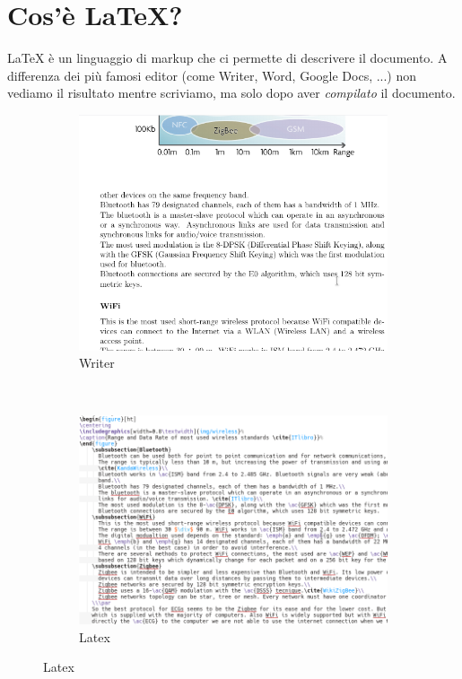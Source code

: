 \section{Cos'\`{e} \LaTeX?}
  \LaTeX{} è un linguaggio di markup che ci permette di descrivere il documento. A differenza dei più famosi editor (come Writer, Word, Google Docs, ...) non vediamo il risultato mentre scriviamo, ma solo dopo aver \emph{compilato} il documento.
  \begin{figure}[!h]
    \centering
    \begin{subfigure}[b]{0.4\textwidth}
        \includegraphics[width=\textwidth]{img/writer}
        \caption{Writer}
    \end{subfigure}~
    \begin{subfigure}[b]{0.4\textwidth}
        \includegraphics[width=\textwidth]{img/latex_source}
        \caption{Latex}
    \end{subfigure}
  \end{figure}

